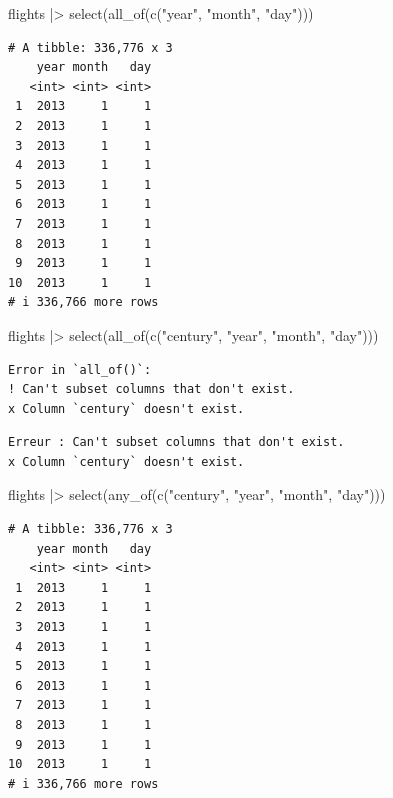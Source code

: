 \documentclass[
  letterpaper,
  DIV=11,
  numbers=noendperiod,
  oneside]{scrreprt}
\newenvironment{Shaded}{\begin{snugshade}}{\end{snugshade}}
\newcommand{\FunctionTok}[1]{\textcolor[rgb]{0.28,0.35,0.67}{#1}}
\newcommand{\NormalTok}[1]{\textcolor[rgb]{0.00,0.23,0.31}{#1}}
\newcommand{\SpecialCharTok}[1]{\textcolor[rgb]{0.37,0.37,0.37}{#1}}
\newcommand{\StringTok}[1]{\textcolor[rgb]{0.13,0.47,0.30}{#1}}
\begin{document}
\begin{Shaded}
\begin{Highlighting}[]
\NormalTok{flights }\SpecialCharTok{|\textgreater{}} 
  \FunctionTok{select}\NormalTok{(}\FunctionTok{all\_of}\NormalTok{(}\FunctionTok{c}\NormalTok{(}\StringTok{"year"}\NormalTok{, }\StringTok{"month"}\NormalTok{, }\StringTok{"day"}\NormalTok{)))}
\end{Highlighting}
\end{Shaded}

\begin{verbatim}
# A tibble: 336,776 x 3
    year month   day
   <int> <int> <int>
 1  2013     1     1
 2  2013     1     1
 3  2013     1     1
 4  2013     1     1
 5  2013     1     1
 6  2013     1     1
 7  2013     1     1
 8  2013     1     1
 9  2013     1     1
10  2013     1     1
# i 336,766 more rows
\end{verbatim}

\begin{Shaded}
\begin{Highlighting}[]
\NormalTok{flights }\SpecialCharTok{|\textgreater{}} 
  \FunctionTok{select}\NormalTok{(}\FunctionTok{all\_of}\NormalTok{(}\FunctionTok{c}\NormalTok{(}\StringTok{"century"}\NormalTok{, }\StringTok{"year"}\NormalTok{, }\StringTok{"month"}\NormalTok{, }\StringTok{"day"}\NormalTok{)))}
\end{Highlighting}
\end{Shaded}

\begin{verbatim}
Error in `all_of()`:
! Can't subset columns that don't exist.
x Column `century` doesn't exist.
\end{verbatim}

\begin{verbatim}
Erreur : Can't subset columns that don't exist. 
x Column `century` doesn't exist.
\end{verbatim}

\begin{Shaded}
\begin{Highlighting}[]
\NormalTok{flights }\SpecialCharTok{|\textgreater{}} 
  \FunctionTok{select}\NormalTok{(}\FunctionTok{any\_of}\NormalTok{(}\FunctionTok{c}\NormalTok{(}\StringTok{"century"}\NormalTok{, }\StringTok{"year"}\NormalTok{, }\StringTok{"month"}\NormalTok{, }\StringTok{"day"}\NormalTok{)))}
\end{Highlighting}
\end{Shaded}

\begin{verbatim}
# A tibble: 336,776 x 3
    year month   day
   <int> <int> <int>
 1  2013     1     1
 2  2013     1     1
 3  2013     1     1
 4  2013     1     1
 5  2013     1     1
 6  2013     1     1
 7  2013     1     1
 8  2013     1     1
 9  2013     1     1
10  2013     1     1
# i 336,766 more rows
\end{verbatim}
\end{document}
